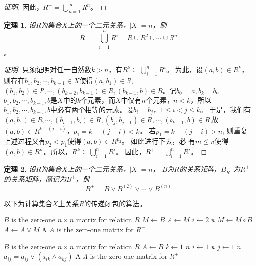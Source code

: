 \documentclass{book}[oneside]
\newtheorem{Thm}{定理}[chapter]
\begin{document}
\begin{CJK*}{UTF8}{gbsn}
\begin{proof}[证明]
    因此，$ R^+ = \bigcup_{n=1}^\infty R^n$。
  \end{proof}
  \begin{Thm}
    设$R$为集合$X$上的一个二元关系，$|X| = n$，则\[R^+ = \bigcup_{i=1}^nR^i = R \cup R^2  \cup \cdots \cup R^n \]。
  \end{Thm}
  \begin{proof}[证明]
      只须证明对任一自然数$k > n$，有$R^k \subseteq \bigcup_{i=1}^nR^i$。
      为此，设$(a,b) \in R^k$，则存在$b_1, b_2, \cdots, b_{k-1} \in
      X$使得$(a,b_1) \in R$, $(b_1, b_2) \in R, \cdots, (b_{k-2}, b_{k-1})\in R,
      (b_{k-1}, b) \in R$。记$b_0 = a, b_k = b$。  $b_1,b_2, \cdots,
      b_{k-1}, b$是$X$中的$k$个元素，而$X$中仅有$n$个元素，$n < k$，所以$b_1,
      b_2, \cdots, b_{k-1}, b$中必有两个相等的元素。设$b_i=b_j$，$1 \leq i < j
      \leq k$。  于是，我们有$(a,b_1)\in R, \cdots, (b_{i-1}, b_i)\in R,
      (b_j, b_{j+1})\in R, \cdots, (b_{k-1},b)\in R$,故$(a,b)\in
      R^{k-(j-i)}$，$p_1=k-(j-i) < k$。  若$p_1 = k - (j - i) > n$, 则重复
      上述过程又有$p_2 < p_1$使得$(a,b) \in R^{p_2}$。  如此进行下去，必
      有$m \leq n$使得$(a,b) \in R^m$。所以，$R^k \subseteq
      \bigcup_{i=1}^nR^i$。  因此，$R^+=\bigcup_{i=1}^nR^i$。
  \end{proof}

    \begin{Thm}
    设$R$为集合$X$上的一个二元关系，$|X| = n$， $B$为$R$的关系矩阵，$B_{R^+}$为$R^+$的关系矩阵，简记为$B^+$，则
    \begin{equation*}
      B^+ = B \lor B^{(2)} \lor \cdots \lor B^{(n)}
    \end{equation*}
  \end{Thm}

  以下为计算集合$X$上关系$R$的传递闭包的算法。
   \begin{codebox}
    \zi \Comment $B$ is the zero-one $n \times n$ matrix for relation $R$
    \li $M \gets B$
    \li $A \gets M$
    \li \For $i \gets 2$ \To $n$
    \li \Do
        $M \gets M \circ B$
    \li $A \gets A \lor M$
    \End
    \li \Return A \Comment $A$ is the zero-one matrix for $R^+$
  \end{codebox}
  \begin{codebox}
    \zi \Comment $B$ is the zero-one $n \times n$ matrix for relation $R$
    \li $A \gets B$
    \li \For $k \gets 1$ \To $n$
    \li \Do
    \For $i \gets 1$ \To $n$
    \li \Do
    \For $j \gets 1$ \To $n$
    \li \Do
    $a_{ij} = a_{ij} \lor (a_{ik} \land a_{kj})$
    \End
    \End
    \End
    \li \Return A \Comment $A$ is the zero-one matrix for $R^+$
  \end{codebox}  


\end{CJK*}
\end{document}
